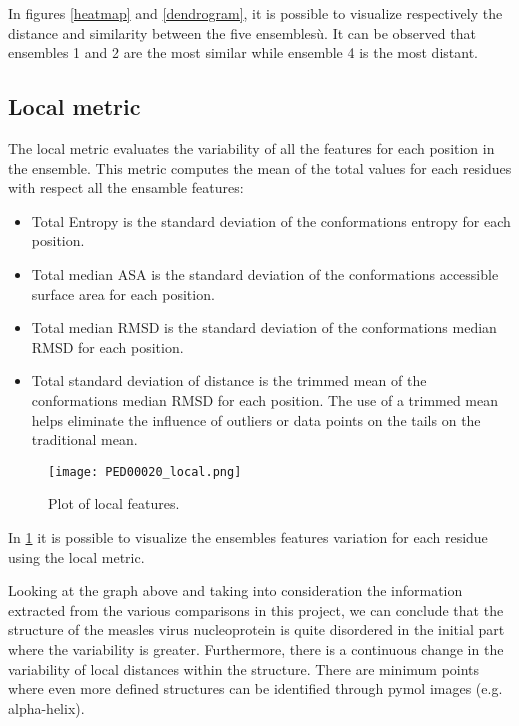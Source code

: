 In figures \ref{heatmap} and \ref{dendrogram}, it is possible to visualize respectively the distance and similarity between the five ensemblesù. It can be observed that ensembles 1 and 2 are the most similar while ensemble 4 is the most distant.


\subsection{Local metric}
The local metric evaluates the variability of all the features for each position in the ensemble.
This metric computes the mean of the total values for each residues with respect all the ensamble features: %
\begin{itemize}
\item Total Entropy is the standard deviation of the conformations entropy for each position.
\item Total median ASA is the standard deviation of the conformations accessible surface area for each position.
\item Total median RMSD is the standard deviation of the conformations median RMSD for each position.
\item Total standard deviation of distance is the trimmed mean of the conformations median RMSD for each position. 
The use of a trimmed mean helps eliminate the influence of outliers or data points on the tails on the traditional mean.
\end{itemize}

\begin{figure}[H]
	\begin{minipage}[b]{0.97\textwidth}
		\centering
		\texttt{[image: PED00020\_local.png]}
		\caption{Plot of local features.}
		\label{plot}
	\end{minipage}	
\end{figure}
In \ref{plot} it is possible to visualize the ensembles features variation for each residue using the local metric. 

Looking at the graph above and taking into consideration the information extracted from the various comparisons in this project, we can conclude that the structure of the measles virus nucleoprotein is quite disordered in the initial part where the variability is greater. Furthermore, there is a continuous change in the variability of local distances within the structure. There are minimum points where even more defined structures can be identified through pymol images (e.g. alpha-helix).%